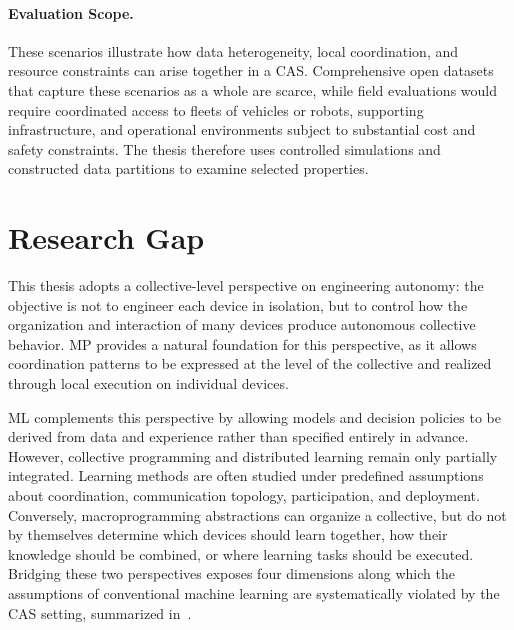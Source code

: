 \paragraph{Evaluation Scope.}
These scenarios illustrate how data heterogeneity, local coordination,
 and resource constraints can arise together in a \gls{CAS}.
%
Comprehensive open datasets that capture these scenarios as a whole are scarce,
 while field evaluations would require coordinated access to fleets of vehicles
 or robots, supporting infrastructure, and operational environments subject to
 substantial cost and safety constraints.
%
The thesis therefore uses controlled simulations and constructed data partitions
 to examine selected properties.

\section{Research Gap}

This thesis adopts a collective-level perspective on engineering autonomy:
 the objective is not to engineer each device in isolation,
 but to control how the organization and interaction of many devices
 produce autonomous collective behavior.
%
\gls{MP} provides a natural foundation for this perspective,
 as it allows coordination patterns to be expressed at the level of the collective
 and realized through local execution on individual devices.

\gls{ML} complements this perspective by allowing models and decision policies 
 to be derived from data and experience rather than specified entirely in advance.
%
However, 
 collective programming and distributed learning remain only partially integrated.
%
Learning methods are often studied under predefined assumptions about coordination, 
 communication topology, participation, and deployment.
%
Conversely, 
 macroprogramming abstractions can organize a collective, 
 but do not by themselves determine which devices should learn together, 
 how their knowledge should be combined, or where learning tasks should be executed.
%
Bridging these two perspectives exposes four dimensions along which
 the assumptions of conventional machine learning are systematically
 violated by the CAS setting, summarized in~.

